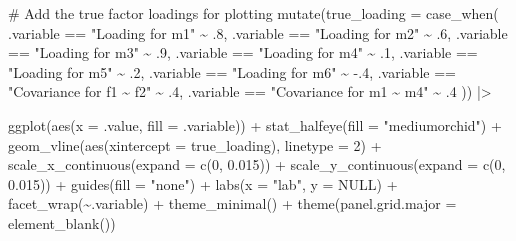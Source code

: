 \documentclass[
  letterpaper,
  DIV=11,
  numbers=noendperiod]{scrreprt}
\newenvironment{Shaded}{\begin{snugshade}}{\end{snugshade}}
\newcommand{\AttributeTok}[1]{\textcolor[rgb]{0.40,0.45,0.13}{#1}}
\newcommand{\CommentTok}[1]{\textcolor[rgb]{0.37,0.37,0.37}{#1}}
\newcommand{\ConstantTok}[1]{\textcolor[rgb]{0.56,0.35,0.01}{#1}}
\newcommand{\DecValTok}[1]{\textcolor[rgb]{0.68,0.00,0.00}{#1}}
\newcommand{\FloatTok}[1]{\textcolor[rgb]{0.68,0.00,0.00}{#1}}
\newcommand{\FunctionTok}[1]{\textcolor[rgb]{0.28,0.35,0.67}{#1}}
\newcommand{\NormalTok}[1]{\textcolor[rgb]{0.00,0.23,0.31}{#1}}
\newcommand{\SpecialCharTok}[1]{\textcolor[rgb]{0.37,0.37,0.37}{#1}}
\newcommand{\StringTok}[1]{\textcolor[rgb]{0.13,0.47,0.30}{#1}}
\begin{document}
\begin{Shaded}
\begin{Highlighting}[]
  \CommentTok{\# Add the true factor loadings for plotting}
  \FunctionTok{mutate}\NormalTok{(}\AttributeTok{true\_loading =} \FunctionTok{case\_when}\NormalTok{(}
\NormalTok{    .variable }\SpecialCharTok{==} \StringTok{"Loading for m1"} \SpecialCharTok{\textasciitilde{}}\NormalTok{ .}\DecValTok{8}\NormalTok{,}
\NormalTok{    .variable }\SpecialCharTok{==} \StringTok{"Loading for m2"} \SpecialCharTok{\textasciitilde{}}\NormalTok{ .}\DecValTok{6}\NormalTok{,}
\NormalTok{    .variable }\SpecialCharTok{==} \StringTok{"Loading for m3"} \SpecialCharTok{\textasciitilde{}}\NormalTok{ .}\DecValTok{9}\NormalTok{,}
\NormalTok{    .variable }\SpecialCharTok{==} \StringTok{"Loading for m4"} \SpecialCharTok{\textasciitilde{}}\NormalTok{ .}\DecValTok{1}\NormalTok{,}
\NormalTok{    .variable }\SpecialCharTok{==} \StringTok{"Loading for m5"} \SpecialCharTok{\textasciitilde{}}\NormalTok{ .}\DecValTok{2}\NormalTok{,}
\NormalTok{    .variable }\SpecialCharTok{==} \StringTok{"Loading for m6"} \SpecialCharTok{\textasciitilde{}} \SpecialCharTok{{-}}\NormalTok{.}\DecValTok{4}\NormalTok{,}
\NormalTok{    .variable }\SpecialCharTok{==} \StringTok{"Covariance for f1 \textasciitilde{} f2"} \SpecialCharTok{\textasciitilde{}}\NormalTok{ .}\DecValTok{4}\NormalTok{,}
\NormalTok{    .variable }\SpecialCharTok{==} \StringTok{"Covariance for m1 \textasciitilde{} m4"} \SpecialCharTok{\textasciitilde{}}\NormalTok{ .}\DecValTok{4}
\NormalTok{  )) }\SpecialCharTok{|\textgreater{}}

  \FunctionTok{ggplot}\NormalTok{(}\FunctionTok{aes}\NormalTok{(}\AttributeTok{x =}\NormalTok{ .value, }\AttributeTok{fill =}\NormalTok{ .variable)) }\SpecialCharTok{+}
  \FunctionTok{stat\_halfeye}\NormalTok{(}\AttributeTok{fill =} \StringTok{"mediumorchid"}\NormalTok{) }\SpecialCharTok{+}
  \FunctionTok{geom\_vline}\NormalTok{(}\FunctionTok{aes}\NormalTok{(}\AttributeTok{xintercept =}\NormalTok{ true\_loading), }\AttributeTok{linetype =} \DecValTok{2}\NormalTok{) }\SpecialCharTok{+} 
  \FunctionTok{scale\_x\_continuous}\NormalTok{(}\AttributeTok{expand =} \FunctionTok{c}\NormalTok{(}\DecValTok{0}\NormalTok{, }\FloatTok{0.015}\NormalTok{)) }\SpecialCharTok{+}
  \FunctionTok{scale\_y\_continuous}\NormalTok{(}\AttributeTok{expand =} \FunctionTok{c}\NormalTok{(}\DecValTok{0}\NormalTok{, }\FloatTok{0.015}\NormalTok{)) }\SpecialCharTok{+}
  \FunctionTok{guides}\NormalTok{(}\AttributeTok{fill =} \StringTok{"none"}\NormalTok{) }\SpecialCharTok{+}
  \FunctionTok{labs}\NormalTok{(}\AttributeTok{x =} \StringTok{"lab"}\NormalTok{,}
     \AttributeTok{y =} \ConstantTok{NULL}\NormalTok{)  }\SpecialCharTok{+}
  \FunctionTok{facet\_wrap}\NormalTok{(}\SpecialCharTok{\textasciitilde{}}\NormalTok{.variable) }\SpecialCharTok{+}
  \FunctionTok{theme\_minimal}\NormalTok{() }\SpecialCharTok{+} 
  \FunctionTok{theme}\NormalTok{(}\AttributeTok{panel.grid.major =} \FunctionTok{element\_blank}\NormalTok{())}
\end{Highlighting}
\end{Shaded}
\end{document}
